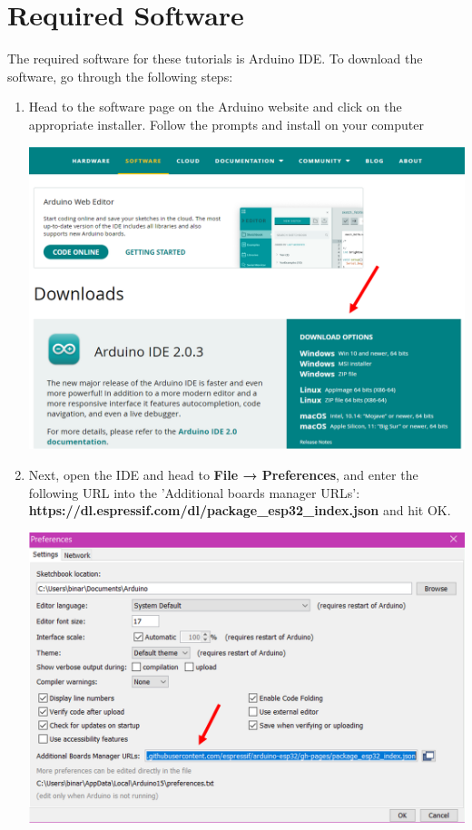 \documentclass[a4paper,12pt]{report}
\newcommand{\imageWidth}{140mm}
\begin{document}
\newpage
\section*{Required Software}
The required software for these tutorials is Arduino IDE. To download the software, go through the following steps:
    \begin{enumerate}
        \item Head to the software page on the Arduino website and click on the appropriate installer. Follow the prompts and install on your computer
        
        \begin{center}
            \includegraphics[width = \imageWidth]{Assets/Downloads_page.png}
        \end{center}
        
        \item Next, open the IDE and head to \textbf{File → Preferences}, and enter the following URL into the 'Additional boards manager URLs':
        \textbf{https://dl.espressif.com/dl/package\_esp32\_index.json} and hit OK.
        
        \begin{center}
            \includegraphics[width = \imageWidth]{Assets/Esp_url.png}
        \end{center}
        

\end{enumerate}
\end{document}

